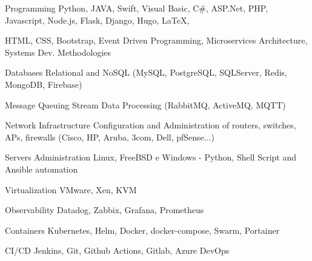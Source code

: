 

\begin{cvskills}

  \cvskill
    {Programming} %
    {Python, JAVA, Swift, Visual Basic, C\#, ASP.Net, PHP, Javascript, Node.js, Flask, Django, Hugo, LaTeX,} %

\cvskill
{} %
{HTML, CSS, Bootstrap, Event Driven Programming, Microservices Architecture, Systems Dev. Methodologies } %

\cvskill
    {Databases} %
    {Relational and NoSQL (MySQL, PostgreSQL, SQLServer, Redis, MongoDB, Firebase)} %

\cvskill
    {Message Queuing} %
    {Stream Data Processing (RabbitMQ, ActiveMQ, MQTT)} %

\cvskill
    {Network Infrastructure} %
    {Configuration and Administration of routers, switches, APs, firewalls (Cisco, HP, Aruba, 3com, Dell, pfSense...)} %

\cvskill
    {Servers Administration} %
    {Linux, FreeBSD e Windows - Python, Shell Script and Ansible automation} %

\cvskill
    {Virtualization} %
    {VMware, Xen, KVM} %

\cvskill
    {Observability} %
    {Datadog, Zabbix, Grafana, Prometheus} %


\cvskill
    {Containers} %
    {Kubernetes, Helm, Docker, docker-compose, Swarm, Portainer} %

\cvskill
    {CI/CD} %
    {Jenkins, Git, Github Actions, Gitlab, Azure DevOps} %



\end{cvskills}
